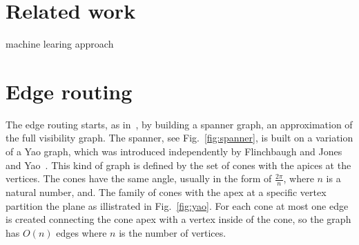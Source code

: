 \documentclass{gd-llncs}
\begin{document}
\section*{Related work}
\cite{graphviz}

\cite{regraph}

\cite{skewed}

\cite{circos}

\cite{gibson2013survey}

machine learing approach
\cite{kwon2017would}

\cite{lin2013interactive}

\cite{cosmograph}

\section*{Edge routing}
The edge routing starts, as in~\cite{dwyer2010fast}, by building a spanner graph, an approximation of the full visibility graph. The spanner, see Fig.~\ref{fig:spanner}, is built on a variation of a Yao graph, which was introduced independently by Flinchbaugh and Jones~\cite{flinchbaugh1981strong}  and Yao~\cite{yao1982constructing}. This kind of graph is defined by the set of cones with the apices at the vertices. The cones have the same angle, usually in the form of $\frac{2\pi} {n}$, where $n$ is a natural number, and.  The family of cones with the apex at a specific vertex partition the plane as illistrated in Fig.~\ref{fig:yao}. For each cone at most one edge is created connecting the cone apex with a vertex inside of the cone, so the graph has $O(n)$ edges where $n$ is the number of vertices. \\
\end{document}
